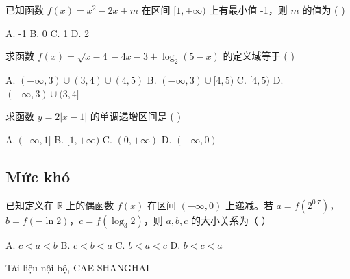 \documentclass[11pt, a4paper]{article}
\begin{document}
\begin{baitap}[7]
已知函数 $f(x) = x^2 - 2x + m$ 在区间 $[1, +\infty)$ 上有最小值 -1，则 $m$ 的值为 ( )
\par\vspace{3pt}
\noindent A. -1 \quad B. 0 \quad C. 1 \quad D. 2
\end{baitap}
\begin{baitap}[8]
求函数 $f(x) = \sqrt{x-4} - 4x - 3 + \log_{2}(5 - x)$ 的定义域等于 ( )
\par\vspace{3pt}
\noindent A. $(-\infty, 3) \cup (3,4) \cup (4,5)$ \quad B. $(-\infty, 3) \cup [4,5)$ \quad C. $[4,5)$ \quad D. $(-\infty, 3) \cup (3,4]$
\end{baitap}
\begin{baitap}[9]
求函数 $y = 2|x-1|$ 的单调递增区间是 ( )
\par\vspace{3pt}
\noindent A. $(-\infty, 1]$ \quad B. $[1, +\infty)$ \quad C. $(0, +\infty)$ \quad D. $(-\infty, 0)$
\end{baitap}
\subsection{Mức khó}

\begin{baitap}[10]
已知定义在 $\mathbb{R}$ 上的偶函数 $f(x)$ 在区间 $(-\infty, 0)$ 上递减。若 $a = f(2^{0.7})$，$b = f(-\ln 2)$，$c = f(\log_3 2)$，则 $a, b, c$ 的大小关系为（ ）
\par\vspace{3pt}
\noindent A. $c < a < b$ \quad B. $c < b < a$ \quad C. $b < a < c$ \quad D. $b < c < a$
\end{baitap}
\vspace{0.8cm}
\begin{center}
{\footnotesize\color{cae_blue} Tài liệu nội bộ, CAE SHANGHAI}
\end{center}
\end{document}
